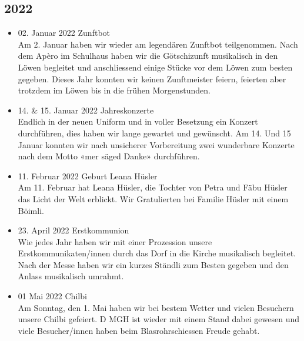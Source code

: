 \subsection*{2022}
\begin{history}


    \begin{itemize}

        \item 02. Januar 2022 Zunftbot\\
              Am 2. Januar haben wir wieder am legendären Zunftbot teilgenommen.
              Nach dem Apèro im Schulhaus haben wir die Götschizunft musikalisch in den Löwen
              begleitet und anschliessend einige Stücke vor dem Löwen zum besten gegeben. Dieses Jahr
              konnten wir keinen Zunftmeister feiern, feierten aber trotzdem im Löwen bis in die frühen
              Morgenstunden.

        \item 14. \& 15. Januar 2022 Jahreskonzerte\\
              Endlich in der neuen Uniform und in voller Besetzung ein Konzert durchführen, dies haben
              wir lange gewartet und gewünscht. Am 14. Und 15 Januar konnten wir nach unsicherer
              Vorbereitung zwei wunderbare Konzerte nach dem Motto «mer säged Danke» durchführen.

        \item 11. Februar 2022 Geburt Leana Hüsler\\
              Am 11. Februar hat Leana Hüsler, die Tochter von Petra und Fäbu Hüsler das Licht der Welt
              erblickt. Wir Gratulierten bei Familie Hüsler mit einem Böimli.

        \item 23. April 2022 Erstkommunion\\
              Wie jedes Jahr haben wir mit einer Prozession unsere Erstkommunikaten/innen durch das
              Dorf in die Kirche musikalisch begleitet.
              Nach der Messe haben wir ein kurzes Ständli zum Besten gegeben und den Anlass
              musikalisch umrahmt.

        \item 01 Mai 2022 Chilbi\\
              Am Sonntag, den 1. Mai haben wir bei bestem Wetter und vielen Besuchern unsere Chilbi
              gefeiert.
              D MGH ist wieder mit einem Stand dabei gewesen und viele Besucher/innen haben beim
              Blasrohrschiessen Freude gehabt.


\end{itemize}
\end{history}
